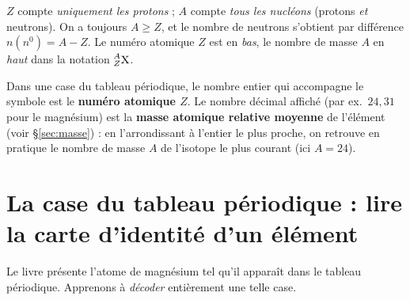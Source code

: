 \documentclass[11pt,a4paper]{article}
\newcommand{\nuc}[3]{\prescript{#1}{#2}{\mathrm{#3}}}  %
\newcommand{\nz}{n^{0}}      %
\newcommand{\nnn}{n(\nz)}    %
\begin{document}
\begin{attention}
$Z$ compte \emph{uniquement les protons} ; $A$ compte \emph{tous les nucléons} (protons \emph{et}
neutrons). On a toujours $A \ge Z$, et le nombre de neutrons s'obtient par différence $\nnn = A - Z$.
Le numéro atomique $Z$ est en \emph{bas}, le nombre de masse $A$ en \emph{haut} dans la notation
$\nuc{A}{Z}{X}$.
\end{attention}

\begin{remarque}
Dans une case du tableau périodique, le nombre entier qui accompagne le symbole est le \textbf{numéro
atomique $Z$}. Le nombre décimal affiché (par ex.\ $24{,}31$ pour le magnésium) est la \textbf{masse
atomique relative moyenne} de l'élément (voir §\ref{sec:masse}) : en l'arrondissant à l'entier le plus
proche, on retrouve en pratique le nombre de masse $A$ de l'isotope le plus courant (ici $A = 24$).
\end{remarque}

\section{La case du tableau périodique : lire la carte d'identité d'un élément}
Le livre présente l'atome de magnésium tel qu'il apparaît dans le tableau périodique. Apprenons à
\emph{décoder} entièrement une telle case.
\end{document}
